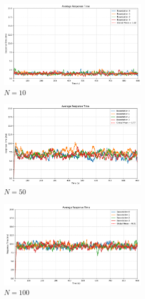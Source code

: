 \documentclass{report}
\begin{document}
\begin{figure}[H]
    \begin{subfigure}{0.55\textwidth}
        \centering
        \includegraphics[width=0.8\textwidth]{img/rt_10.png}
        \caption{$N=10$}
    \end{subfigure}
    \begin{subfigure}{0.55\textwidth}
        \centering
        \includegraphics[width=0.8\textwidth]{img/rt_50.png}
        \caption{$N=50$}
        \label{rt_50}
    \end{subfigure}
    \begin{subfigure}{0.55\textwidth}
        \centering
        \includegraphics[width=0.8\textwidth]{img/rt_100.png}
        \caption{$N=100$}
    \end{subfigure}
    \caption{}
\end{figure}
\end{document}

